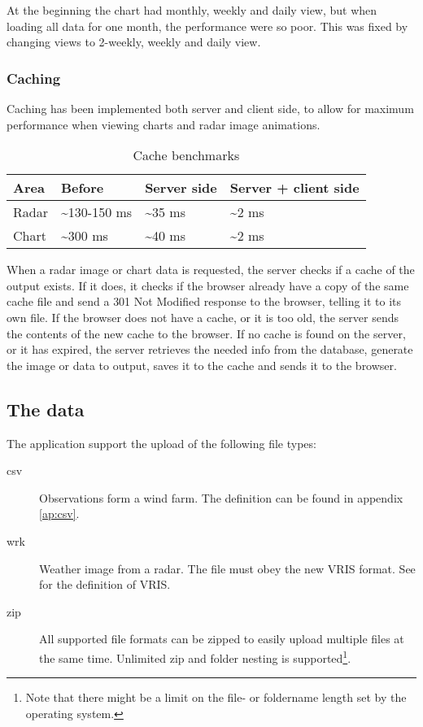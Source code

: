 At the beginning the chart had monthly, weekly and daily view, but when loading all data for one month, the performance were so poor. This was fixed by changing views to 2-weekly, weekly and daily view.
\subsubsection{Caching}
Caching has been implemented both server and client side, to allow for maximum performance when viewing charts and radar image animations.

\begin{table}[htbp]
\centering
\begin{tabular}{|l|l|l|l|}
\hline
\textbf{Area} & \textbf{Before} & \textbf{Server side} & \textbf{Server + client side}\\
\hline
Radar & \textasciitilde 130-150 ms & \textasciitilde 35 ms & \textasciitilde 2 ms\\
\hline
Chart & \textasciitilde 300 ms & \textasciitilde 40 ms & \textasciitilde 2 ms\\
\hline
\end{tabular}
\label{tab:cache_benchmarks}
\caption{Cache benchmarks}
\end{table}

When a radar image or chart data is requested, the server checks if a cache of the output exists. If it does, it checks if the browser already have a copy of the same cache file and send a \textsf{301 Not Modified} response to the browser, telling it to its own file.
If the browser does not have a cache, or it is too old, the server sends the contents of the new cache to the browser.
If no cache is found on the server, or it has expired, the server retrieves the needed info from the database, generate the image or data to output, saves it to the cache and sends it to the browser.


\subsection{The data}
The application support the upload of the following file types:
\begin{description}
\item[csv] Observations form a wind farm. The definition can be found in appendix \ref{ap:csv}.
\item[wrk] Weather image from a radar. The file must obey the new VRIS format. See \cite{VRIS} for the definition of VRIS.
\item[zip] All supported file formats can be zipped to easily upload multiple files at the same time. Unlimited zip and folder nesting is supported\footnote{Note that there might be a limit on the file- or foldername length set by the operating system.}.
\end{description}